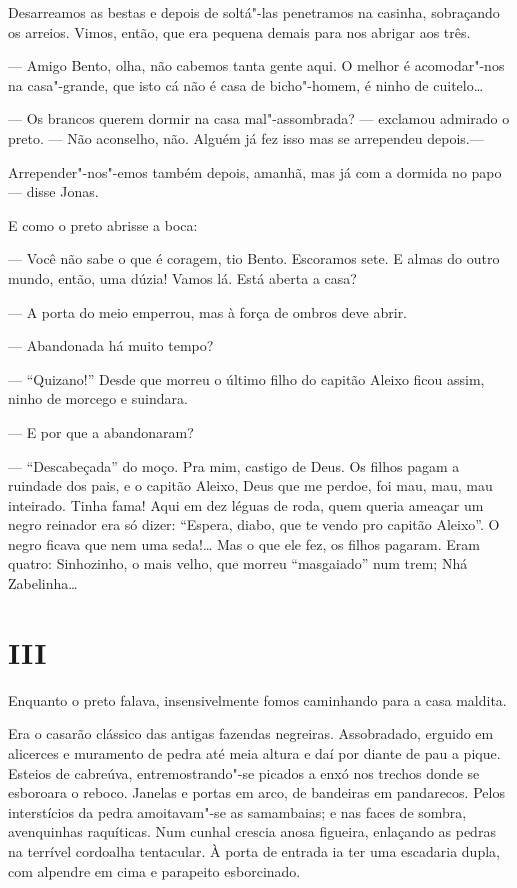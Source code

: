 Desarreamos as bestas e depois de soltá"-las penetramos na casinha,
sobraçando os arreios. Vimos, então, que era pequena demais para nos
abrigar aos três.

--- Amigo Bento, olha, não cabemos tanta gente aqui. O melhor é
acomodar"-nos na casa"-grande, que isto cá não é casa de bicho"-homem, é
ninho de cuitelo\ldots{}

--- Os brancos querem dormir na casa mal"-assombrada? --- exclamou
admirado o preto. --- Não aconselho, não. Alguém já fez isso mas se
arrependeu depois.---

Arrepender"-nos"-emos também depois, amanhã, mas já com a dormida no papo
--- disse Jonas.

E como o preto abrisse a boca:

--- Você não sabe o que é coragem, tio Bento. Escoramos sete. E almas do
outro mundo, então, uma dúzia! Vamos lá. Está aberta a casa?

--- A porta do meio emperrou, mas à força de ombros deve abrir.

--- Abandonada há muito tempo?

--- ``Quizano!'' Desde que morreu o último filho do capitão Aleixo ficou
assim, ninho de morcego e suindara.

--- E por que a abandonaram?

--- ``Descabeçada'' do moço. Pra mim, castigo de Deus. Os filhos pagam a
ruindade dos pais, e o capitão Aleixo, Deus que me perdoe, foi mau, mau,
mau inteirado. Tinha fama! Aqui em dez léguas de roda, quem queria
ameaçar um negro reinador era só dizer: ``Espera, diabo, que te vendo
pro capitão Aleixo''. O negro ficava que nem uma seda!\ldots{} Mas o que ele
fez, os filhos pagaram. Eram quatro: Sinhozinho, o mais velho, que
morreu ``masgaiado'' num trem; Nhá Zabelinha\ldots{}

\section*{III}

Enquanto o preto falava, insensivelmente fomos caminhando para a casa
maldita.

Era o casarão clássico das antigas fazendas negreiras. Assobradado,
erguido em alicerces e muramento de pedra até meia altura e daí por
diante de pau a pique. Esteios de cabreúva, entremostrando"-se picados a
enxó nos trechos donde se esboroara o reboco. Janelas e portas em arco,
de bandeiras em pandarecos. Pelos interstícios da pedra amoitavam"-se as
samambaias; e nas faces de sombra, avenquinhas raquíticas. Num cunhal
crescia anosa figueira, enlaçando as pedras na terrível cordoalha
tentacular. À porta de entrada ia ter uma escadaria dupla, com alpendre
em cima e parapeito esborcinado.

